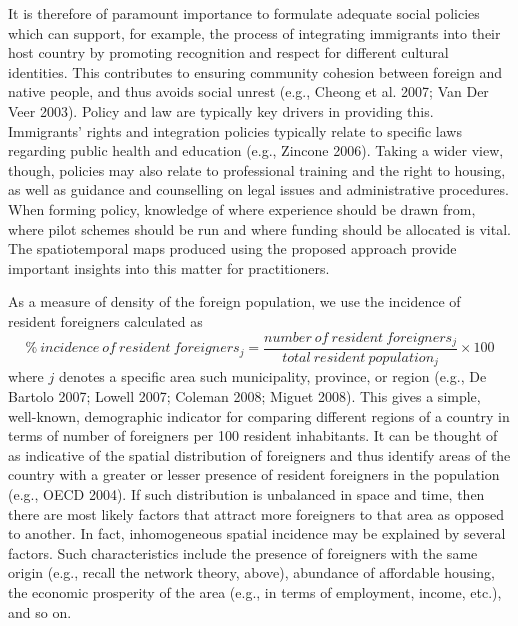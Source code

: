 \documentclass[10pt] {article}
\newcommand{\beq}{\begin{equation}}
\newcommand{\eeq}{\end{equation}}
\theoremstyle{definition}
\theoremstyle{plain}
\begin{document}
It is therefore of paramount importance to formulate adequate social policies which can support, for example, the process of integrating immigrants into their host country by promoting recognition and respect for different cultural identities. This contributes to ensuring community cohesion between foreign and native people, and thus avoids social unrest (e.g., Cheong et al. 2007; Van Der Veer 2003). Policy and law are typically key drivers in providing this. Immigrants' rights and integration policies typically relate to specific laws regarding public health and education (e.g., Zincone 2006). Taking a wider view, though, policies may also relate to professional training and the right to housing, as well as guidance and counselling on legal issues and administrative procedures. When forming policy, knowledge of where experience should be drawn from, where pilot schemes should be run and where funding should be allocated is vital. The spatiotemporal maps produced using the proposed approach provide important insights into this matter for practitioners.


As a measure of density of the foreign population, we use the incidence of resident foreigners calculated as
\beq
\% \ incidence \ of \ resident \ foreigners_j  = \frac{number \ of \ resident \ foreigners_j}{total \ resident \ population_j} \times 100
\label{first.d1}
\eeq
where $j$ denotes a specific area such municipality, province, or region (e.g., De Bartolo 2007; Lowell 2007; Coleman 2008; Miguet 2008). This gives a simple, well-known, demographic indicator for comparing different regions of a country in terms of number of foreigners per 100 resident inhabitants. It can be thought of as indicative of the spatial distribution of foreigners and thus identify areas of the country with a greater or lesser presence of resident foreigners in the population (e.g., OECD 2004). If such distribution is unbalanced in space and time, then there are most likely factors that attract more foreigners to that area as opposed to another. In fact, inhomogeneous spatial incidence may be explained by several factors. Such characteristics include the presence of foreigners with the same origin (e.g., recall the network theory, above), abundance of affordable housing, the economic prosperity of the area (e.g., in terms of employment, income, etc.), and so on.
\end{document}
